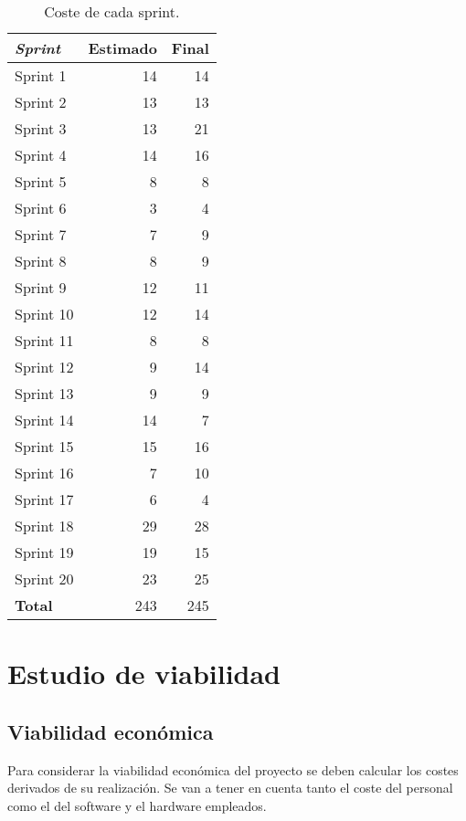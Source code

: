 	\begin{table}[H]
		\begin{tabularx}{\textwidth}{Xrr}
			\toprule \textbf{\textit{Sprint}} & \textbf{Estimado} & \textbf{Final}\\
			\toprule
			Sprint 1 & 14 & 14 \\
			Sprint 2 & 13 & 13 \\
			Sprint 3 & 13 & 21 \\
			Sprint 4 & 14 & 16 \\
			Sprint 5 & 8 & 8 \\
			Sprint 6 & 3 & 4 \\
			Sprint 7 & 7 & 9 \\
			Sprint 8 & 8 & 9 \\
			Sprint 9 & 12 & 11 \\
			Sprint 10 & 12 & 14 \\
			Sprint 11 & 8 & 8 \\
			Sprint 12 & 9 & 14 \\
			Sprint 13 & 9 & 9 \\
			Sprint 14 & 14 & 7 \\
			Sprint 15 & 15 & 16 \\
			Sprint 16 & 7 & 10 \\
			Sprint 17 & 6 & 4 \\
			Sprint 18 & 29 & 28 \\
			Sprint 19 & 19 & 15 \\
	        Sprint 20 & 23 & 25 \\
			\midrule
			\textbf{Total} & 243 & 245 \\
			\bottomrule
		\end{tabularx}
		\caption{Coste de cada sprint.}
		\label{tab:costes_sprints}
	\end{table}


\section{Estudio de viabilidad}

\subsection{Viabilidad económica}
Para considerar la viabilidad económica del proyecto se deben calcular
los costes derivados de su realización. Se van a tener en cuenta tanto el
coste del personal como el del software y el hardware empleados.
